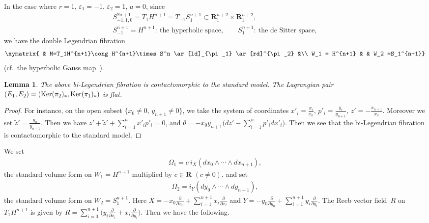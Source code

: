 \documentclass[pdftex]{sigma}
\newtheorem{Lem}[Th]{Lemma}
{ \theoremstyle{definition}
\newtheorem{Def}[Th]{Definition}
\newtheorem{Rem}[Th]{Remark}
\newtheorem{Ex}[Th]{Example}}
\begin{document}
In the case where $r=1$, $\varepsilon_1=-1$, $\varepsilon_2=1$, $a=0$,
since
\begin{gather*}
S_{-1,1,0}^{2n+1}=T_1H^{n+1}=T_{-1}S_1^{n+1}\subset
{\mathbf{R}}_1^{n+2}\times {\mathbf{R}}_1^{n+2},\\
 S_{-1}^{n+1}=H^{n+1}\colon \ \text{the hyperbolic space},
\qquad
S_1^{n+1}\colon \ \text{the de Sitter space},
\end{gather*}
we have the double Legendrian f\/ibration
\begin{gather*}
\xymatrix{
& M=T_1H^{n+1}\cong H^{n+1}\times S^n \ar[ld]_{\pi_1} \ar[rd]^{\pi_2}  &\\
W_1 = H^{n+1} &  & W_2 =S_1^{n+1}}
\end{gather*}
(cf.\ the hyperbolic Gauss map~\cite{I-P-S}).

\begin{Lem}
\label{Minkowskii-M-A}
The above bi-Legendrian fibration is contactomorphic to the standard model.
The Lagrangian pair $(E_1, E_2) = ({\rm Ker}(\pi_2)_*, {\rm Ker}(\pi_1)_*)$
is flat.
\end{Lem}

\begin{proof}
For instance, on the open subset $\{ x_0 \not= 0,\,
y_{n+1} \not= 0\}$, we take the system of coordinates
$x'_i = \frac{x_i}{x_0}$, $p'_i = \frac{y_i}{y_{n+1}}$, $z' =
- \frac{x_{n+1}}{x_0}$.
Moreover we set $\tilde{z}' = \frac{y_0}{y_{n+1}}$.
Then we have $z' + \tilde{z}'  + \sum\limits_{i=1}^n x'_i p'_i = 0$, and
$\theta = - x_0y_{n+1}\Big(dz' - \sum\limits_{i=1}^n p'_i dx'_i\Big)$.
Then we see that the bi-Legendrian f\/ibration is contactomorphic to
the standard model.
\end{proof}

We set
\begin{gather*}
\Omega_1 =
c\ i_X(dx_0\wedge\cdots\wedge dx_{n+1}),
\end{gather*}
the standard volume form on $W_1=H^{n+1}$ multiplied by $c\in {\mathbf{R}}$ $(c\not= 0)$,
and set
\begin{gather*}
\Omega_2 =
i_Y(dy_0\wedge\cdots\wedge dy_{n+1}),
\end{gather*}
the
standard volume form on $W_2=S_1^{n+1}$.
Here $X = -x_0\frac{\partial}{\partial x_0}+\sum\limits_{i=1}^{n+1} x_i\frac{\partial}{\partial x_i}$
and
$Y = -y_0\frac{\partial}{\partial y_0}+\sum\limits_{i=1}^{n+1} y_i\frac{\partial}{\partial y_i}$.
The Reeb vector f\/ield~$R$ on~$T_1H^{n+1}$ is given
by
$R = \sum\limits_{i=0}^{n+1} \big(y_i\frac{\partial}{\partial x_i} +
x_i\frac{\partial}{\partial y_i}\big)$.
Then we have the following.
\end{document}

